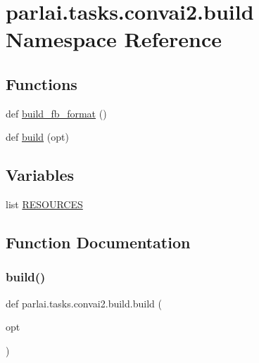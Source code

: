 \hypertarget{namespaceparlai_1_1tasks_1_1convai2_1_1build}{}\section{parlai.\+tasks.\+convai2.\+build Namespace Reference}
\label{namespaceparlai_1_1tasks_1_1convai2_1_1build}
\subsection*{Functions}
\begin{DoxyCompactItemize}
\item 
def \hyperlink{namespaceparlai_1_1tasks_1_1convai2_1_1build_aac893ef8d5159621bc7086097270f7c1}{build\+\_\+fb\+\_\+format} ()
\item 
def \hyperlink{namespaceparlai_1_1tasks_1_1convai2_1_1build_a2faeed65bdc0f4793f8a1f8cb840ec74}{build} (opt)
\end{DoxyCompactItemize}
\subsection*{Variables}
\begin{DoxyCompactItemize}
\item 
list \hyperlink{namespaceparlai_1_1tasks_1_1convai2_1_1build_a45995413b2766f076c1e1759a89009a6}{R\+E\+S\+O\+U\+R\+C\+ES}
\end{DoxyCompactItemize}


\subsection{Function Documentation}
\mbox{\label{namespaceparlai_1_1tasks_1_1convai2_1_1build_a2faeed65bdc0f4793f8a1f8cb840ec74}} 
\subsubsection{\texorpdfstring{build()}{build()}}
{\footnotesize\ttfamily def parlai.\+tasks.\+convai2.\+build.\+build (\begin{DoxyParamCaption}\item[{}]{opt }\end{DoxyParamCaption})}

